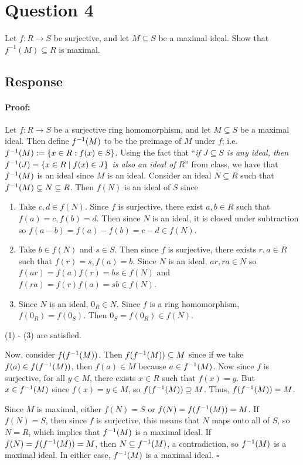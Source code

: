 \documentclass [12pt] {article}
\newenvironment{proof}{\paragraph{Proof:}}{\hfill$\square$}
\begin{document}
\newpage
\section*{Question 4}
Let $f:R\to S$ be surjective, and let $M\subseteq S$ be a maximal ideal. Show that $f^{-1}(M)\subseteq R$ is maximal. 
\subsection*{Response}
\begin{proof}
Let $f : R \to S$ be a surjective ring homomorphism, and let $M \subseteq S$ be a maximal ideal.
Then define $f^{-1}(M)$ to be the preimage of $M$ under $f$; i.e. $f^{-1}(M) := \{x \in R : f(x) \in S\}$.
Using the fact that ``\textit{if $J \subseteq S$ is any ideal, then $f^{-1}(J) = \{x \in R \mid f(x) \in J\}$
is also an ideal of $R$}'' from class, we have that $f^{-1}(M)$ is an ideal since $M$ is an ideal. 
Consider an ideal $N \subseteq R$ such that $f^{-1}(M) \subsetneq N \subseteq R$. Then $f(N)$ is an 
ideal of $S$ since
\begin{enumerate}
    \item Take $c, d \in f(N)$. Since $f$ is surjective, there exist $a, b \in R$ such that
        $f(a) = c, f(b) = d$. Then since $N$ is an ideal, it is closed under subtraction so
        $f(a - b) = f(a) - f(b) = c - d \in f(N)$.
    \item Take $b \in f(N)$ and $s \in S$. Then since $f$ is surjective, there exists
        $r, a \in R$ such that $f(r) = s, f(a) = b$. Since $N$ is an ideal, $ar, ra \in N$ so 
        $f(ar) = f(a)f(r) = bs \in f(N)$ and $f(ra) = f(r)f(a) = sb \in f(N)$.
    \item Since $N$ is an ideal, $0_R \in N$. Since $f$ is a ring homomorphism, $f(0_R) = f(0_S)$. Then
        $0_S = f(0_R) \in f(N)$.
\end{enumerate}
(1) - (3) are satisfied. 
\vspace{1em}

Now, consider $f(f^{-1}(M))$. Then $f(f^{-1}(M)) \subseteq M$ since if we take
$f(a) \in f(f^{-1}(M))$, then $f(a) \in M$ because $a \in f^{-1}(M)$. Now since $f$ is surjective,
for all $y \in M$, there exists $x \in R$ such that $f(x) = y$. But $x \in f^{-1}(M)$ since 
$f(x) = y \in M$, so $f(f^{-1}(M)) \supseteq M$. Thus, $f(f^{-1}(M)) = M$.
\vspace{1em}

Since $M$ is maximal, either $f(N) = S$ or $f(N) = f(f^{-1}(M)) = M$. If $f(N) = S$, then
since $f$ is surjective, this means that $N$ maps onto all of $S$, so $N = R$, which implies that
$f^{-1}(M)$ is a maximal ideal.
If $f(N) = f(f^{-1}(M)) = M$, then $N \subseteq f^{-1}(M)$, a contradiction, so  
$f^{-1}(M)$ is a maximal ideal. In either case, $f^{-1}(M)$ is a maximal ideal.
\end{proof}
\end{document}
